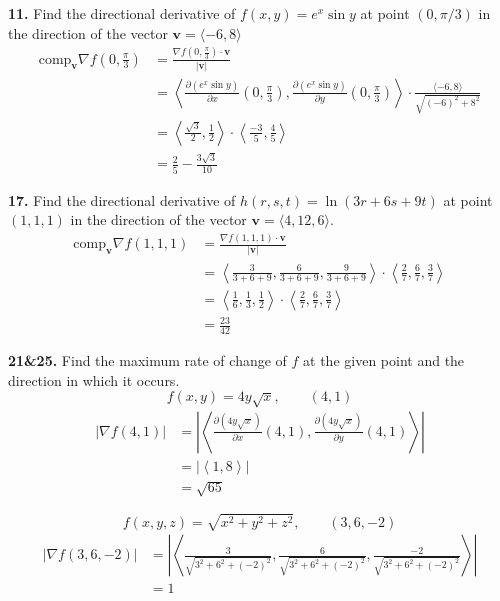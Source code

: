 \documentclass[a4paper,12pt]{article}
\newcommand{\tho}[3][]{\frac{\partial #1 #2}{\partial #3 #1}}
\newcommand{\exercise}[1]{\noindent\textbf{#1.}}
\begin{document}
\exercise{11} Find the directional derivative of $f(x, y) = e^x\sin y$
at point $(0, \pi/3)$ in the direction of the vector
$\mathbf{v} = \langle -6, 8\rangle$
\begin{align*}
  \mathrm{comp}_\mathbf{v}\nabla f\left(0, \frac{\pi}{3}\right)
&= \frac{\nabla f\left(0, \frac{\pi}{3}\right)\cdot\mathbf{v}}{|\mathbf{v}|}\\
&= \left<\tho{(e^x\sin y)}{x}\left(0, \frac{\pi}{3}\right),
         \tho{(e^x\sin y)}{y}\left(0, \frac{\pi}{3}\right)\right>
   \cdot \frac{\langle -6, 8\rangle}{\sqrt{(-6)^2 + 8^2}}\\
&= \left<\frac{\sqrt 3}{2}, \frac{1}{2}\right>
   \cdot \left<\frac{-3}{5}, \frac{4}{5}\right>\\
&= \frac{2}{5} - \frac{3\sqrt 3}{10}
\end{align*}

\exercise{17} Find the directional derivative of
$h(r, s, t) = \ln(3r + 6s + 9t)$ at point $(1, 1, 1)$
in the direction of the vector $\mathbf{v} = \langle 4, 12, 6\rangle$.
\begin{align*}
  \mathrm{comp}_\mathbf{v}\nabla f(1, 1, 1)
&= \frac{\nabla f(1, 1, 1)\cdot\mathbf{v}}{|\mathbf{v}|}\\
&= \left<\frac{3}{3+6+9},\frac{6}{3+6+9},\frac{9}{3+6+9}\right>
   \cdot \left<\frac{2}{7},\frac{6}{7},\frac{3}{7}\right>\\
&= \left<\frac{1}{6},\frac{1}{3},\frac{1}{2}\right>
   \cdot \left<\frac{2}{7},\frac{6}{7},\frac{3}{7}\right>\\
&= \frac{23}{42}
\end{align*}

\exercise{21\&25} Find the maximum rate of change of $f$ at the given point and
the direction in which it occurs.
\[f(x, y) = 4y\sqrt{x},\qquad(4, 1)\tag{21}\]
\begin{align*}
   |\nabla f(4, 1)|
&= \left|\left<\tho{\left(4y\sqrt x\right)}{x}(4, 1),
               \tho{\left(4y\sqrt x\right)}{y}(4, 1)\right>\right|\\
&= \left|\left<1, 8\right>\right|\\
&= \sqrt{65}
\end{align*}

\[f(x, y, z) = \sqrt{x^2 + y^2 + z^2},\qquad(3, 6, -2)\tag{25}\]
\begin{align*}
   |\nabla f(3, 6, -2)|
&= \left|\left<\frac{3}{\sqrt{3^2 + 6^2 + (-2)^2}},
               \frac{6}{\sqrt{3^2 + 6^2 + (-2)^2}},
               \frac{-2}{\sqrt{3^2 + 6^2 + (-2)^2}}\right>\right|\\
&= 1
\end{align*}
\end{document}
